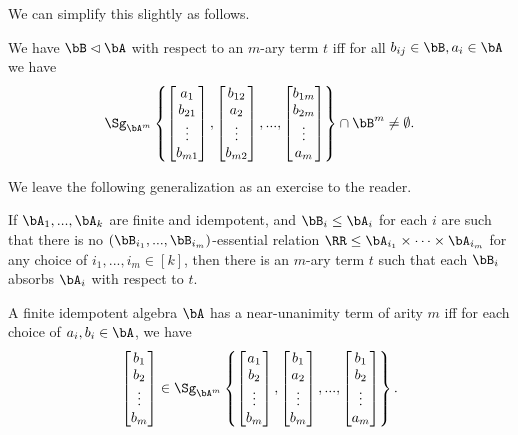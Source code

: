 We can simplify this slightly as follows.

\begin{cor} We have $\bB \lhd \bA$ with respect to an $m$-ary term $t$ iff for all $b_{ij} \in \bB, a_i \in \bA$ we have
\[
\Sg_{\bA^m}\left\{\begin{bmatrix}a_1\\ b_{21}\\ \vdots\\ b_{m1}\end{bmatrix}, \begin{bmatrix}b_{12}\\ a_2\\ \vdots\\ b_{m2}\end{bmatrix}, ..., \begin{bmatrix}b_{1m}\\ b_{2m}\\ \vdots\\ a_m\end{bmatrix}\right\} \cap \bB^m \ne \emptyset.
\]
\end{cor}

We leave the following generalization as an exercise to the reader.

\begin{thm} If $\bA_1, ..., \bA_k$ are finite and idempotent, and $\bB_i \le \bA_i$ for each $i$ are such that there is no $(\bB_{i_1}, ..., \bB_{i_m})$-essential relation $\RR \le \bA_{i_1} \times \cdots \times \bA_{i_m}$ for any choice of $i_1, ..., i_m \in [k]$, then there is an $m$-ary term $t$ such that each $\bB_i$ absorbs $\bA_i$ with respect to $t$.
\end{thm}

\begin{cor} A finite idempotent algebra $\bA$ has a near-unanimity term of arity $m$ iff for each choice of $a_i, b_i \in \bA$, we have
\[
\begin{bmatrix}b_1\\ b_2\\ \vdots\\ b_m\end{bmatrix} \in \Sg_{\bA^m}\left\{\begin{bmatrix}a_1\\ b_2\\ \vdots\\ b_m\end{bmatrix}, \begin{bmatrix}b_1\\ a_2\\ \vdots\\ b_m\end{bmatrix}, ..., \begin{bmatrix}b_1\\ b_2\\ \vdots\\ a_m\end{bmatrix}\right\}.
\]
\end{cor}

